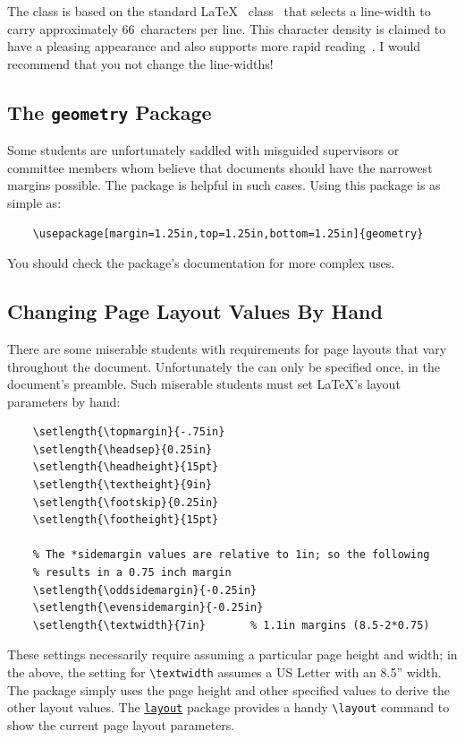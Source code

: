The  class is based on the standard \LaTeX\ 
class~\cite{lamport-1994-ladps} that selects a line-width to carry
approximately 66~characters per line.  This character density is
claimed to have a pleasing appearance and also supports more rapid
reading~\cite{bringhurst-2002-teots}.  I would recommend that you
not change the line-widths!

\subsection{The \texttt{geometry} Package}

Some students are unfortunately saddled with misguided supervisors
or committee members whom believe that documents should have the
narrowest margins possible.  The  package is
helpful in such cases.  Using this package is as simple as:
\begin{lstlisting}
    \usepackage[margin=1.25in,top=1.25in,bottom=1.25in]{geometry}
\end{lstlisting}
You should check the package's documentation for more complex uses.

\subsection{Changing Page Layout Values By Hand}

There are some miserable students with requirements for page layouts
that vary throughout the document.  Unfortunately the
 can only be specified once, in the document's
preamble.  Such miserable students must set \LaTeX's layout parameters
by hand:
\begin{lstlisting}
    \setlength{\topmargin}{-.75in}
    \setlength{\headsep}{0.25in}
    \setlength{\headheight}{15pt}
    \setlength{\textheight}{9in}
    \setlength{\footskip}{0.25in}
    \setlength{\footheight}{15pt}

    % The *sidemargin values are relative to 1in; so the following
    % results in a 0.75 inch margin
    \setlength{\oddsidemargin}{-0.25in}
    \setlength{\evensidemargin}{-0.25in}
    \setlength{\textwidth}{7in}       % 1.1in margins (8.5-2*0.75)
\end{lstlisting}
These settings necessarily require assuming a particular page height
and width; in the above, the setting for \verb+\textwidth+ assumes
a \textsc{US} Letter with an 8.5'' width.
The  package simply uses the page height and
other specified values to derive the other layout values.
The
\href{http://tug.ctan.org/tex-archive/macros/latex/required/tools/layout.pdf}{\texttt{layout}}
package provides a
handy \verb+\layout+ command to show the current page layout
parameters. 


